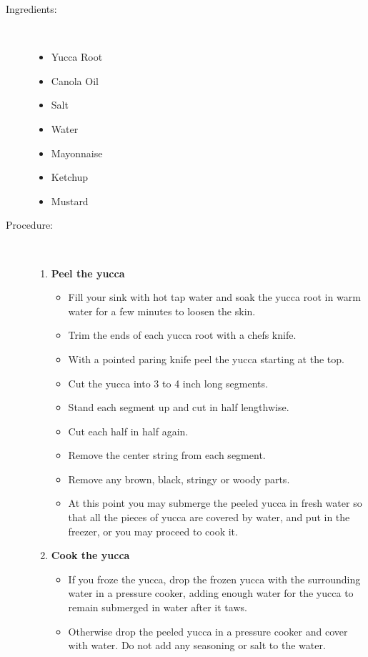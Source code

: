 \documentclass[11pt,letterpaper]{article}
\begin{document}
\begin{description}

\item[Ingredients:]\ \\
	\begin{itemize}
	\item Yucca Root
	\item Canola Oil
	\item Salt
	\item Water
	\item Mayonnaise
	\item Ketchup
	\item Mustard
	\end{itemize}

\item[Procedure:]\ \\
	\begin{enumerate}
	\item {\bf Peel the yucca}
	\begin{itemize}
	\item Fill your sink with hot tap water and soak the yucca root in warm water for a few minutes to loosen the skin.
	\item Trim the ends of each yucca root with a chefs knife.
        \item With a pointed paring knife peel the yucca starting at the top. 
	\item Cut the yucca into 3 to 4 inch long segments.
	\item Stand each segment up and cut in half lengthwise.
	\item Cut each half in half again.
	\item Remove the center string from each segment.
	\item Remove any brown, black, stringy or woody parts.
	\item At this point you may submerge the peeled yucca in fresh water so that all the pieces of yucca are covered by water, and put in the freezer, or you may proceed to cook it.
	\end{itemize}
	\item {\bf Cook the yucca}
	\begin{itemize}
	\item If you froze the yucca, drop the frozen yucca with the surrounding water in a pressure cooker, adding enough water for the yucca to remain submerged in water after it taws.  
	\item Otherwise drop the peeled yucca in a pressure cooker and cover with water. Do not add any seasoning or salt to the water.

\end{itemize}
\end{enumerate}
\end{description}
\end{document}
